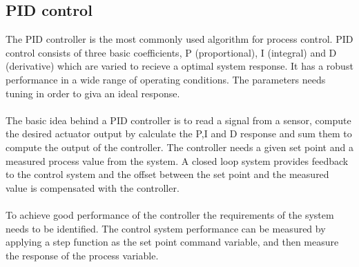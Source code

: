 


\subsection{PID control}
The PID controller is the most commonly used algorithm for process control. 
PID control consists of three basic coefficients, P (proportional), I (integral) and D (derivative) which are varied to recieve a optimal system response. It has a robust performance in a wide range of operating conditions. The parameters needs tuning in order to giva an ideal response.\\
\\
The basic idea behind a PID controller is to read a signal from a sensor, compute the desired actuator output by calculate the P,I and D response and sum them to compute the output of the controller. The controller needs a given set point and a measured process value from the system. A closed loop system provides feedback to the control system and the offset between the set point and the measured value is compensated with the controller.
\\
\\
To achieve good performance of the controller the requirements of the system needs to be identified. The control system performance can be measured by applying a step function as the set point command variable, and then measure the response of the process variable.
\\
\\
